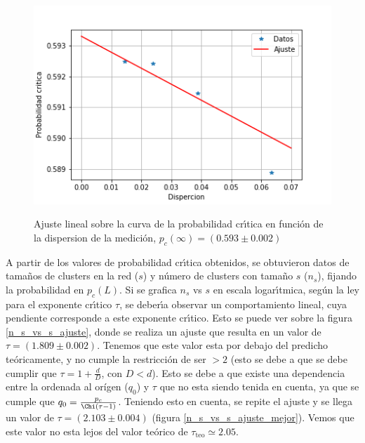 \documentclass[
 reprint,
 amsmath,amssymb,
 aps,
]{revtex4-1}
\begin{document}
\begin{figure}[ht]
\begin{center}
\includegraphics[scale=0.62]{../images/ajuste.png} \\
\caption{Ajuste lineal sobre la curva de la probabilidad cr\'\i tica en funci\'on de la dispersion de la medici\'on, $p_c(\infty) = (0.593 \pm 0.002)$}\label{ajuste}
\end{center}
\end{figure}

A partir de los valores de probabilidad cr\'\i tica obtenidos, se obtuvieron datos de tama\~nos de clusters en la red ($s$) y n\'umero de clusters con tama\~no $s$ ($n_s$), fijando la probabilidad en $p_c(L)$. Si se grafica $n_s$ vs $s$ en escala logar\'\i tmica, seg\'un la ley para el exponente cr\'\i tico $\tau$, se deber\'\i a observar un comportamiento lineal, cuya pendiente corresponde a este exponente cr\'\i tico. Esto se puede ver sobre la figura \ref{n_s_vs_s_ajuste}, donde se realiza un ajuste que resulta en un valor de $\tau = (1.809 \pm 0.002)$.
Tenemos que este valor esta por debajo del predicho te\'oricamente, y no cumple la restricci\'on de ser $>2$ (esto se debe a que se debe cumplir que $\tau = 1 + \frac{d}{D}$, con $D < d$). Esto se debe a que existe una dependencia entre la ordenada al or\'igen ($q_0$) y $\tau$ que no esta siendo tenida en cuenta, ya que se cumple que $q_0 = \frac{p_c}{\Chi(\tau - 1)}$. Teniendo esto en cuenta, se repite el ajuste y se llega un valor de $\tau = (2.103 \pm 0.004)$ (figura \ref{n_s_vs_s_ajuste_mejor}).
Vemos que este valor no esta lejos del valor te\'orico de $\tau_\text{teo} \simeq 2.05$.
\end{document}
